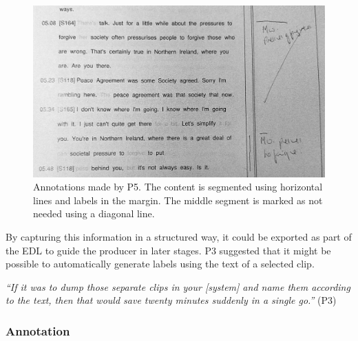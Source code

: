\begin{figure}[h]
  \centering
  \includegraphics[width=\columnwidth]{figs/pen-annotations-p5-cropped-bw.jpg}
  \caption{Annotations made by P5. The content is segmented using horizontal lines and labels in the margin. The
  middle segment is marked as not needed using a diagonal line.}
  \label{fig:p5-annotations}
\end{figure}



By capturing this information in a structured way, it could be exported as part of the EDL to guide the producer in
later stages.  P3 suggested that it might be possible to automatically generate labels using the text of a selected
clip.

\textit{``If it was to dump those separate clips in your [system] and name them according to the text, then that would
save twenty minutes suddenly in a single go.''} (P3)


\subsubsection{Annotation}

